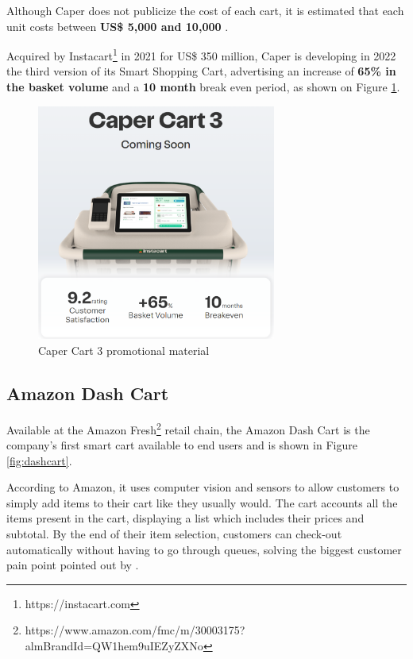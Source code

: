 \documentclass[openright]{normas-utf-tex} %
\begin{document}
Although Caper does not publicize the cost of each cart, it is estimated that each unit costs between
\textbf{US\$ 5,000 and 10,000} \cite{TWP2021}.

Acquired by Instacart\footnote{https://instacart.com} in 2021 for US\$ 350
million, Caper is developing in 2022 the third version of its Smart Shopping
Cart, advertising an increase of \textbf{65\% in the basket volume} and a
\textbf{10 month} break even period, as shown on Figure \ref{fig:caperad}.

\begin{figure}[H]
	\centering
	\includegraphics[width=0.7\textwidth]{./images/capercart3.png}
	\caption[Caper Cart 3 promotional material]{Caper Cart 3 promotional material}
	\label{fig:caperad}
\end{figure}


\subsection{Amazon Dash Cart}

Available at the Amazon Fresh\footnote{https://www.amazon.com/fmc/m/30003175?almBrandId=QW1hem9uIEZyZXNo} retail chain, the
Amazon Dash Cart is the company's first smart cart available to end users and is shown in
Figure \ref{fig:dashcart}.

According to Amazon, it uses computer vision and sensors to allow customers to
simply add items to their cart like they usually would. The cart accounts all
the items present in the cart, displaying a list which includes their prices
and subtotal. By the end of their item selection, customers can check-out
automatically without having to go through queues, solving the biggest customer
pain point pointed out by \cite{Capgemini2020}.
\end{document}
